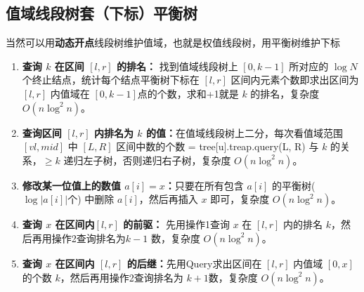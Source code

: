 \subsection{值域线段树套（下标）平衡树}

\par \noindent 当然可以用\textbf{动态开点}线段树维护值域，也就是权值线段树，用平衡树维护下标
~\\
\begin{enumerate}
\item \textbf{查询 $k$ 在区间 $[l,r]$ 的排名：} 找到值域线段树上 $[0,k-1]$ 所对应的 $\log N$个终止结点，统计每个结点平衡树下标在 $[l,r]$ 区间内元素个数即求出区间为 $[l,r]$ 内值域在 $[0,k-1]$点的个数，求和+1就是 $k$ 的排名，复杂度 $O(n\log^2n)$。

\item \textbf{查询区间 $[l,r]$ 内排名为 $k$ 的值：}在值域线段树上二分，每次看值域范围 $[vl,mid]$ 中 $[L,R]$ 区间中数的个数 = tree[u].treap.query(L, R) 与 $k$ 的关系，$\ge k$ 递归左子树，否则递归右子树，复杂度 $O(n\log^2 n)$。
\item \textbf{修改某一位值上的数值 $a[i]=x$：}只要在所有包含 $a[i]$ 的平衡树($\log {|a[i]|}$个) 中删除 $a[i]$，然后再插入 $x$ 即可，复杂度 $O(n\log^2n)$。
\item \textbf{查询 $x$ 在区间内$[l,r]$ 的前驱：} 先用操作1查询 $x$ 在 $[l,r]$ 内的排名 $k$，然后再用操作2查询排名为$k-1$ 数，复杂度 $O(n\log^2n)$。
\item \textbf{查询 $x$ 在区间内 $[l,r]$ 的后继：}先用Query求出区间在 $[l,r]$ 内值域 $[0,x]$ 的个数 $k$，然后再用操作2查询排名为 $k+1$数，复杂度 $O(n\log^2n)$。
\end{enumerate}

